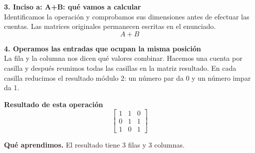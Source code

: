 \documentclass[11pt,a4paper,landscape]{article}
\begin{document}
\noindent\begin{minipage}{\linewidth}\textbf{3. Inciso a: A+B: qué vamos a calcular}\\[2pt]Identificamos la operación y comprobamos sus dimensiones antes de efectuar las cuentas. Las matrices originales permanecen escritas en el enunciado.
\[A+B\]
\end{minipage}\par\medskip
\noindent\begin{minipage}{\linewidth}\textbf{4. Operamos las entradas que ocupan la misma posición}\\[2pt]La fila y la columna nos dicen qué valores combinar. Hacemos una cuenta por casilla y después reunimos todas las casillas en la matriz resultado. En cada casilla reducimos el resultado módulo 2: un número par da 0 y un número impar da 1.
\par{}\par\smallskip
\par\smallskip \textbf{Resultado de esta operación}\[\begin{bmatrix}1 & 1 & 0\\0 & 1 & 1\\1 & 0 & 1\end{bmatrix}\]
\par\smallskip\textbf{Qué aprendimos.} El resultado tiene 3 filas y 3 columnas.
\end{minipage}\par\medskip
\end{document}
